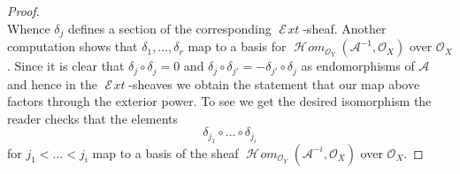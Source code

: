 \documentclass[10pt,a4paper]{amsart}
\theoremstyle{plain}
\theoremstyle{definition}
\theoremstyle{remark}
\numberwithin{equation}{subsection}
\def\SheafHom{\mathop{\mathcal{H}\!\mathit{om}}\nolimits}
\def\SheafExt{\mathop{\mathcal{E}\!\mathit{xt}}\nolimits}
\begin{document}
\begin{proof}
$$$$
Whence $\delta_j$ defines a section of the corresponding
$\SheafExt$-sheaf.
Another computation shows that $\delta_1, \ldots, \delta_r$
map to a basis for $\SheafHom_{\mathcal{O}_Y}(\mathcal{A}^{-1}, \mathcal{O}_X)$
over $\mathcal{O}_X$.
Since it is clear that $\delta_j \circ \delta_j = 0$
and $\delta_j \circ \delta_{j'} = - \delta_{j'} \circ \delta_j$
as endomorphisms of $\mathcal{A}$ and hence in the
$\SheafExt$-sheaves
we obtain the statement that our map above factors through
the exterior power. To see we get the desired isomorphism
the reader checks that the elements
$$
\delta_{j_1} \circ \ldots \circ \delta_{j_i}
$$
for $j_1 < \ldots < j_i$ map to a basis of the sheaf
$\SheafHom_{\mathcal{O}_Y}(\mathcal{A}^{-i}, \mathcal{O}_X)$
over $\mathcal{O}_X$.
\end{proof}
\end{document}
